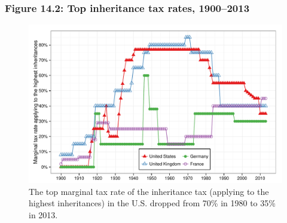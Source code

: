 \documentclass[t]{beamer}\usepackage[]{graphicx}\usepackage[]{color}
\newenvironment{knitrout}{}{} %
\begin{document}
\begin{frame}[label=Figure_14_2]
\frametitle{Figure 14.2: Top inheritance tax rates, 1900--2013}
\begin{figure}[t]
\begin{minipage}[b]{\textwidth}
\centering
\begin{knitrout}\footnotesize
{}\color{fgcolor}

{\centering \includegraphics[width=1\linewidth]{figures/color/Figure_14_2} 

}



\end{knitrout}
\caption{The top marginal tax rate of the inheritance tax (applying to the highest inheritances) in the U.S. dropped from 70\% in 1980 to 35\% in 2013.}
\end{minipage}
\end{figure}
\end{frame}
\end{document}
